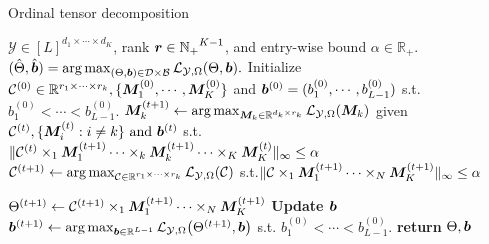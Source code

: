 \documentclass{article}
\theoremstyle{plain}
\theoremstyle{definition}
\begin{document}
\begin{algorithm}[tb]
        \caption{Ordinal tensor decomposition }\label{alg}
        \begin{algorithmic}[]
              
            $\mathcal{Y}\in [L]^{d_1\times\cdots\times d_K}
            $, rank $\bm{r}\in \mathbb{N_+}^{K-1}$, and entry-wise bound $\alpha\in \mathbb{R_+}$.
             $(\hat\Theta,\hat{\bm{b}}) =  \operatorname*{arg\,max}_{(\Theta,\bm{b})\in \mathcal{D}\times\mathcal{B}}  \mathcal{L}_{\mathcal{Y},\Omega}(\Theta,\bm{b}).$
            \STATE Initialize $\mathcal{C}^{(0)}\in\mathbb{R}^{r_1\times\cdots\times r_k}, \{\bm M_1^{(0)},\cdots,\bm M_K^{(0)}\}$ and $\bm{b}^{(0)} = ( b_1^{(0)},\cdots,b^{(0)}_{L-1})$ s.t. $b_1^{(0)}<\cdots<b_{L-1}^{(0)}$.
             \STATE $\bm M_k^{(t+1)}\gets\operatorname*{arg\,max}_{\bm M_k\in\mathbb{R}^{d_k\times r_k}}\mathcal{L}_{\mathcal{Y},\Omega}(\bm M_k)$ given $ \mathcal{C}^{(t)},\{\bm M_i^{(t)}: i\neq k\} \text{ and } \bm{b}^{(t)}$ s.t.\\
             $\|\mathcal{C}^{(t)}\times_1\bm M_1^{(t+1)}\cdots\times_k\bm M_k^{(t+1)}\cdots\times_K\bm M_K^{(t)}\|_\infty \leq \alpha$
            \ENDFOR
            \STATE $\mathcal{C}^{(t+1)} \gets \operatorname*{arg\,max}_{\mathcal{C}\in \mathbb{R}^{r_1\times\cdots\times r_k}}\mathcal{L}_{\mathcal{Y},\Omega}(\mathcal{C})$
            s.t.\newline $\|\mathcal{C}\times_1\bm M_1^{(t+1)}\cdots\times_N\bm M_K^{(t+1)}\|_\infty \leq \alpha$

            \STATE $\Theta^{(t+1)} \gets \mathcal{C}^{(t+1)}\times_1\bm M_1^{(t+1)}\cdots\times_N\bm M_K^{(t+1)}$
            \STATE \textbf{Update $\bm{b}$}
            \STATE $\bm{b}^{(t+1)} \gets \operatorname*{arg\,max}_{\bm{b}\in \mathbb{R}^{L-1}}\mathcal{L}_{\mathcal{Y},\Omega}\big(\Theta^{(t+1)},\bm{b}\big)$  s.t. $b_1^{(0)}<\cdots<b_{L-1}^{(0)}$.
            \ENDFOR
            \STATE \textbf{return}
            $\Theta,\bm{b}$
        \end{algorithmic}
    \end{algorithm}
\end{document}
